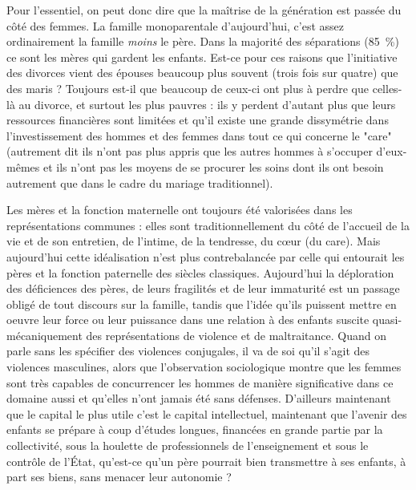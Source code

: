  Pour l'essentiel, on peut donc dire que la maîtrise de la génération est passée du côté des femmes. La famille monoparentale d'aujourd'hui, c'est assez ordinairement la famille \emph{moins} le père. Dans la majorité des séparations (85~\%) ce sont les mères qui gardent les enfants. Est-ce pour ces raisons que l'initiative des divorces vient des épouses beaucoup plus souvent (trois fois sur quatre) que des maris  ? Toujours est-il que beaucoup de ceux-ci ont plus à perdre que celles-là au divorce, et surtout les plus pauvres : ils y perdent d'autant plus que leurs ressources financières sont limitées et qu'il existe une grande dissymétrie dans l'investissement des hommes et des femmes dans tout ce qui concerne le "care" (autrement dit  ils n'ont pas plus appris que les autres hommes à s'occuper d'eux-mêmes et ils n'ont pas les moyens de se procurer les soins dont ils ont besoin autrement que dans le cadre du mariage traditionnel). 

 Les mères et la fonction maternelle ont toujours été valorisées dans les représentations communes : elles sont traditionnellement du côté de l'accueil de la vie et de son entretien, de l'intime, de la tendresse, du cœur (du care). Mais aujourd'hui cette idéalisation n'est plus contrebalancée par celle qui entourait les pères et la fonction paternelle des siècles classiques. Aujourd'hui la déploration des déficiences des pères, de leurs fragilités et de leur immaturité est un passage obligé de tout discours sur la famille, tandis que l'idée qu'ils puissent mettre en oeuvre leur force ou leur puissance dans une relation à des enfants suscite quasi-mécaniquement des représentations de violence et de maltraitance. Quand on parle sans les spécifier des violences conjugales, il va de soi qu'il s'agit des violences masculines, alors que l'observation sociologique montre que les femmes sont très capables de concurrencer les hommes de manière significative dans ce domaine aussi et qu'elles n'ont jamais été sans défenses. D'ailleurs maintenant que le capital le plus utile c'est le capital intellectuel, maintenant que l'avenir des enfants se prépare à coup d'études longues, financées en grande partie par la collectivité, sous la houlette de professionnels de l'enseignement et sous le contrôle de l'État, qu'est-ce qu'un père pourrait bien transmettre à ses enfants, à part ses biens, sans menacer leur autonomie ?

